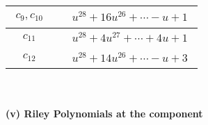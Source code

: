 \documentclass[1p]{elsarticle_modified}
\theoremstyle{definition}
\begin{document}
\begin{tabular}{m{50pt}|m{274pt}}
\hline $$\begin{aligned}c_{9},c_{10}\end{aligned}$$&$\begin{aligned}
&u^{28}+16 u^{26}+\cdots- u+1
\end{aligned}$\\
\hline $$\begin{aligned}c_{11}\end{aligned}$$&$\begin{aligned}
&u^{28}+4 u^{27}+\cdots+4 u+1
\end{aligned}$\\
\hline $$\begin{aligned}c_{12}\end{aligned}$$&$\begin{aligned}
&u^{28}+14 u^{26}+\cdots- u+3
\end{aligned}$\\
\hline
\end{tabular}\\~\\
\newpage\renewcommand{\arraystretch}{1}
\flushleft \textbf{(v) Riley Polynomials at the component}\newline \\
\end{document}
